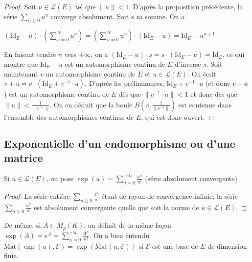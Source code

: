 \begin{proof}
Soit $u \in \mathcal{L}(E)$ tel que $\|u\| < 1$. D'après la proposition précédente, la série $\sum_{n \geq 0} u^n$ converge absolument. Soit $s$ sa somme. On a

$(\mathrm{Id}_E - u) \cdot \left(\sum_{n=0}^N u^n\right) = \left(\sum_{n=0}^N u^n\right) \cdot (\mathrm{Id}_E - u) = \mathrm{Id}_E - u^{n+1}$

En faisant tendre $n$ vers $+\infty$, on a $(\mathrm{Id}_E - u) \cdot s = s \cdot (\mathrm{Id}_E - u) = \mathrm{Id}_E$, ce qui montre que $\mathrm{Id}_E - u$ est un automorphisme continu de $E$ d'inverse $s$. Soit maintenant $v$ un automorphisme continu de $E$ et $u \in \mathcal{L}(E)$. On écrit $v + u = v \cdot (\mathrm{Id}_E + v^{-1} \cdot u)$. D'après les préliminaires, $\mathrm{Id}_E + v^{-1} \cdot u$ (et donc $v + u$) est un automorphisme continu de $E$ dès que $\|v^{-1} \cdot u\| < 1$ et donc dès que $\|u\| < \frac{1}{\|v^{-1}\|}$.
On en déduit que la boule $B(v, \frac{1}{\|v^{-1}\|})$ est contenue dans l'ensemble des automorphismes continus de $E$, qui est donc ouvert.
\end{proof}

\subsection{Exponentielle d'un endomorphisme ou d'une matrice}

\begin{de}
Si $u \in \mathcal{L}(E)$, on pose $\exp(u) = \sum_{n=0}^{+\infty} \frac{u^n}{n!}$ (série absolument convergente)
\end{de}

\begin{proof}
La série entière $\sum_{n \geq 0} \frac{z^n}{n!}$ étant de rayon de convergence infinie, la série $\sum_{n \geq 0} \frac{u^n}{n!}$ est absolument convergente quelle que soit la norme de $u \in \mathcal{L}(E)$.
\end{proof}

\begin{rem}
De même, si $A \in M_p(K)$, on définit de la même façon $\exp(A) = e^A = \sum_{n=0}^{+\infty} \frac{A^n}{n!}$. On a bien entendu $\mathrm{Mat}(\exp(u),\mathcal{E}) = \exp(\mathrm{Mat}(u,\mathcal{E}))$ si $\mathcal{E}$ est une base de $E$ de dimension finie.
\end{rem}


